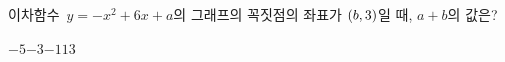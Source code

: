 이차함수~$y=-x^2+6x+a$의 그래프의 꼭짓점의 좌표가 $(b{,}\mkern3mu 3)$일 때, $a+b$의 값은? 
\begin{choices32}{$-5$}{$-3$}{$-1$}{$1$}{$3$}\end{choices32}
